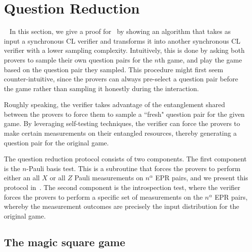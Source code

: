 \section{Question Reduction}~\label{sec:introspection}
In this section, we give a proof for~ by showing an algorithm that takes as input a synchronous CL verifier and transforms it into another synchronous CL verifier with a lower sampling complexity. Intuitively, this is done by asking both provers to sample their own question pairs for the $n$th game, and play the game based on the question pair they sampled. This procedure might first seem counter-intuitive, since the provers can always pre-select a question pair before the game  rather than sampling it honestly during the interaction. 

Roughly speaking, the verifier takes advantage of the entanglement shared between the provers to force them to sample a ``fresh" question pair for the given game. By leveraging self-testing techniques, the verifier can force the provers to make certain measurements on their entangled resources, thereby generating a question pair for the original game. 

The question reduction protocol consists of two components. The first component is the $n$-Pauli basis test. This is a subroutine that forces the provers to perform either an all $X$ or all $Z$ Pauli measurements on $n^{\alpha}$ EPR pairs, and we present this protocol in~. The second component is the introspection test, where the verifier forces the provers to perform a specific set of measurements on the $n^{\alpha}$ EPR pairs, whereby the measurement outcomes are precisely the input distribution for the original game. 

\subsection{The magic square game}

